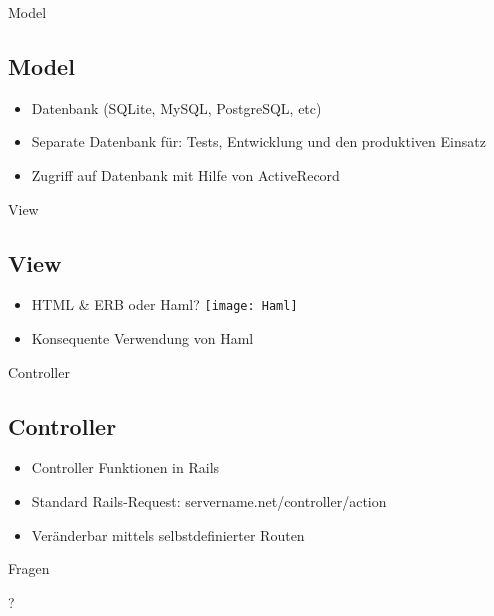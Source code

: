 \documentclass{beamer}
\begin{document}
\begin{frame}{Model}
\subsection{Model}
\begin{itemize}
 \item Datenbank (SQLite, MySQL, PostgreSQL, etc)
 \item Separate Datenbank für: Tests, Entwicklung und den produktiven Einsatz
 \item Zugriff auf Datenbank mit Hilfe von ActiveRecord
\end{itemize}
\end{frame}
\begin{frame}{View}
\subsection{View}
\begin{itemize}
\item HTML \& ERB oder Haml?
\bigbreak
\noindent\texttt{[image: Haml]}
\bigbreak
\bigbreak
\item Konsequente Verwendung von Haml
\end{itemize}
\end{frame}
\begin{frame}{Controller}
\subsection{Controller}
\begin{itemize}
\item Controller Funktionen in Rails
 \item  Standard Rails-Request: servername.net/controller/action
 \item  Veränderbar mittels selbstdefinierter Routen
\end{itemize}


\end{frame}
\begin{frame}{Fragen}
 \begin{center}
\fontsize{60}{80}\selectfont ?
 \end{center}
\end{frame}
\end{document}
